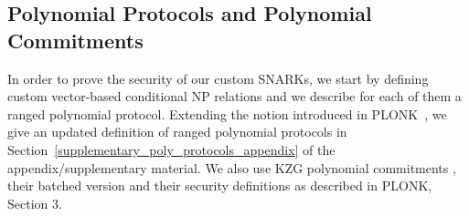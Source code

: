 \subsection{Polynomial Protocols and Polynomial Commitments}
In order to prove the security of our custom SNARKs, we start by defining custom vector-based conditional NP relations and we describe for each of them a ranged polynomial protocol. 
Extending the notion introduced in PLONK~\cite{plonk}, we give an updated definition of ranged polynomial protocols in Section~\ref{supplementary_poly_protocols_appendix} of the appendix/supplementary material. 
We also use KZG polynomial commitments \cite{KZG_10}, their batched version and their security definitions as described in PLONK, Section 3. 


